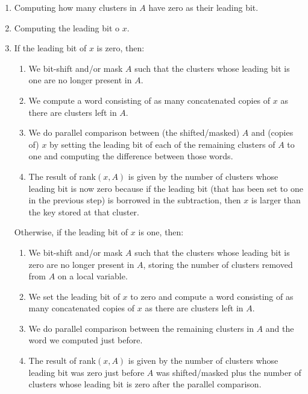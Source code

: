 \begin{enumerate}
    \item
    Computing how many clusters in $A$ have zero as their leading bit.
    
    \item
    Computing the leading bit o $x$.
    
    \item
    If the leading bit of $x$ is zero, then:
    \begin{enumerate}
        \item
        We bit-shift and/or mask $A$ such that the clusters whose leading bit is one are no longer present in $A$.
        
        \item
        We compute a word consisting of as many concatenated copies of $x$ as there are clusters left in $A$.
        
        \item
        We do parallel comparison between (the shifted/masked) $A$ and (copies of) $x$ by setting the leading bit of each of the remaining clusters of $A$ to one and computing the difference between those words.
        
        \item
        The result of rank$(x,A)$ is given by the number of clusters whose leading bit is now zero because if the leading bit (that has been set to one in the previous step) is borrowed in the subtraction, then $x$ is larger than the key stored at that cluster.
    \end{enumerate}
    
    Otherwise, if the leading bit of $x$ is one, then:
    \begin{enumerate}
        \item
        We bit-shift and/or mask $A$ such that the clusters whose leading bit is zero are no longer present in $A$, storing the number of clusters removed from $A$ on a local variable.
        
        \item
		We set the leading bit of $x$ to zero and compute a word consisting of as many concatenated copies of $x$ as there are clusters left in $A$.
		
		\item
        We do parallel comparison between the remaining clusters in $A$ and the word we computed just before.
        
        \item
        The result of rank$(x,A)$ is given by the number of clusters whose leading bit was zero just before $A$ was shifted/masked plus the number of clusters whose leading bit is zero after the parallel comparison.
    \end{enumerate}
    
\end{enumerate}

